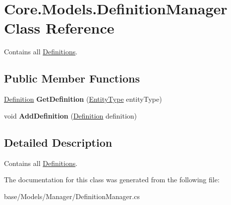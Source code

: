 \hypertarget{classCore_1_1Models_1_1DefinitionManager}{\section{Core.\-Models.\-Definition\-Manager Class Reference}
\label{classCore_1_1Models_1_1DefinitionManager}
}


Contains all \hyperlink{namespaceCore_1_1Models_1_1Definitions}{Definitions}.  


\subsection*{Public Member Functions}
\begin{DoxyCompactItemize}
\item 
\hypertarget{classCore_1_1Models_1_1DefinitionManager_a08d79c044487af124f2a449e200e84c2}{\hyperlink{classCore_1_1Models_1_1Definitions_1_1Definition}{Definition} {\bfseries Get\-Definition} (\hyperlink{namespaceCore_1_1Models_1_1Definitions_a609ed13db028308ebc6c5fbd98615fdc}{Entity\-Type} entity\-Type)}\label{classCore_1_1Models_1_1DefinitionManager_a08d79c044487af124f2a449e200e84c2}

\item 
\hypertarget{classCore_1_1Models_1_1DefinitionManager_a11c894ac62397f0ecd223475f81ac770}{void {\bfseries Add\-Definition} (\hyperlink{classCore_1_1Models_1_1Definitions_1_1Definition}{Definition} definition)}\label{classCore_1_1Models_1_1DefinitionManager_a11c894ac62397f0ecd223475f81ac770}

\end{DoxyCompactItemize}


\subsection{Detailed Description}
Contains all \hyperlink{namespaceCore_1_1Models_1_1Definitions}{Definitions}. 



The documentation for this class was generated from the following file\-:\begin{DoxyCompactItemize}
\item 
base/\-Models/\-Manager/Definition\-Manager.\-cs\end{DoxyCompactItemize}
